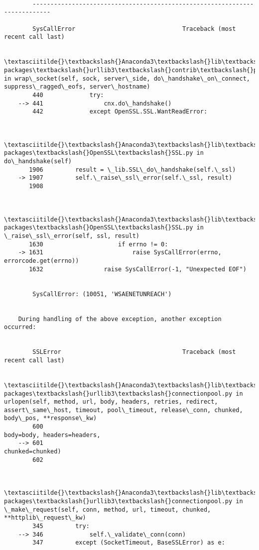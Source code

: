 \documentclass[11pt]{article}
\begin{document}
    \begin{Verbatim}[commandchars=\\\{\}]

        ---------------------------------------------------------------------------

        SysCallError                              Traceback (most recent call last)

        \textasciitilde{}\textbackslash{}Anaconda3\textbackslash{}lib\textbackslash{}site-packages\textbackslash{}urllib3\textbackslash{}contrib\textbackslash{}pyopenssl.py in wrap\_socket(self, sock, server\_side, do\_handshake\_on\_connect, suppress\_ragged\_eofs, server\_hostname)
        440             try:
    --> 441                 cnx.do\_handshake()
        442             except OpenSSL.SSL.WantReadError:
    

        \textasciitilde{}\textbackslash{}Anaconda3\textbackslash{}lib\textbackslash{}site-packages\textbackslash{}OpenSSL\textbackslash{}SSL.py in do\_handshake(self)
       1906         result = \_lib.SSL\_do\_handshake(self.\_ssl)
    -> 1907         self.\_raise\_ssl\_error(self.\_ssl, result)
       1908 
    

        \textasciitilde{}\textbackslash{}Anaconda3\textbackslash{}lib\textbackslash{}site-packages\textbackslash{}OpenSSL\textbackslash{}SSL.py in \_raise\_ssl\_error(self, ssl, result)
       1630                     if errno != 0:
    -> 1631                         raise SysCallError(errno, errorcode.get(errno))
       1632                 raise SysCallError(-1, "Unexpected EOF")
    

        SysCallError: (10051, 'WSAENETUNREACH')

        
    During handling of the above exception, another exception occurred:
    

        SSLError                                  Traceback (most recent call last)

        \textasciitilde{}\textbackslash{}Anaconda3\textbackslash{}lib\textbackslash{}site-packages\textbackslash{}urllib3\textbackslash{}connectionpool.py in urlopen(self, method, url, body, headers, retries, redirect, assert\_same\_host, timeout, pool\_timeout, release\_conn, chunked, body\_pos, **response\_kw)
        600                                                   body=body, headers=headers,
    --> 601                                                   chunked=chunked)
        602 
    

        \textasciitilde{}\textbackslash{}Anaconda3\textbackslash{}lib\textbackslash{}site-packages\textbackslash{}urllib3\textbackslash{}connectionpool.py in \_make\_request(self, conn, method, url, timeout, chunked, **httplib\_request\_kw)
        345         try:
    --> 346             self.\_validate\_conn(conn)
        347         except (SocketTimeout, BaseSSLError) as e:
    


\end{Verbatim}
\end{document}
